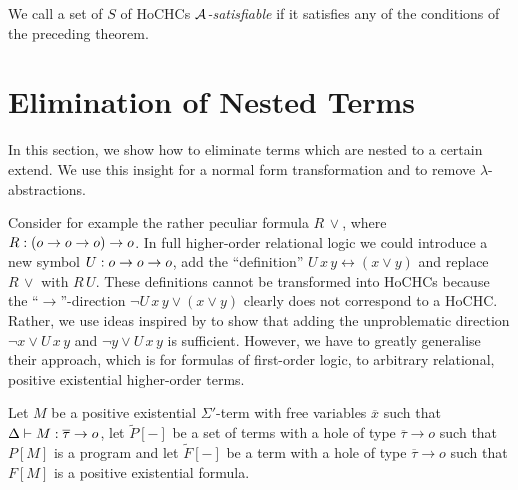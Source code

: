 \documentclass[a4paper,twoside,notitlepage,openright,11pt]{report}
\begin{document}
We call a set of $S$ of HoCHCs \emph{$\mathcal A$-satisfiable} if it satisfies any of the conditions of the preceding theorem.

\section{Elimination of Nested Terms}
\label{sec:elimnest}
\label{SEC:ELIMNEST}
In this section, we show how to eliminate terms which are nested to a certain extend. We use this insight for a normal form transformation and to remove $\lambda$-abstractions.

 Consider for example the rather peculiar formula $R\,\lor$, where $R:(o\to o\to o)\to o$. In  full higher-order relational logic we could introduce a new symbol $U: o\to o\to o$, add the ``definition'' $U\,x\,y\leftrightarrow (x\lor y)$ and replace $R\,\lor$ with $R\,U$. These definitions cannot be transformed into HoCHCs because the ``$\rightarrow$''-direction $\neg U\,x\,y\lor (x\lor y)$ clearly does not correspond to a HoCHC. Rather, we use ideas inspired by \cite{PG86} to show that adding the unproblematic direction $\neg x\lor U\,x\,y$ and $\neg y\lor U\,x\,y$ is sufficient. However, we have to greatly generalise their approach, which is for formulas of first-order logic, to arbitrary relational, positive existential higher-order terms.

Let $M$ be a positive existential $\Sigma'$-term with free variables $\overline x$ such that $\Delta\vdash M:\overline\tau\to o$, let $\widetilde P[-]$ be a set of terms with a hole of type $\overline\tau\to o$ such that $P[M]$ is a program and let $\widetilde F[-]$ be a term with a hole of type $\overline\tau\to o$ such that $F[M]$ is a positive existential formula.
\end{document}
